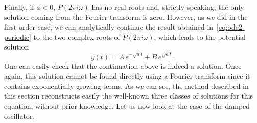 Finally, if $a<0$, $P(2\pi i\omega)$ has no real roots and, strictly speaking, the only
solution coming from the Fourier transform is zero. However, as we did in the first-order
case, we can analytically continue the result obtained in~\cref{eq:ode2-periodic} to the
two complex roots of $P(2\pi i\omega)$, which leads to the potential solution
\begin{equation}
  y(t)=A\,e^{-\sqrt{a}t}+B\,e^{\sqrt{a}t}\,.
  \label{eq:ode2-exp}
\end{equation}
One can easily check that the continuation above is indeed a solution. Once again, this
solution cannot be found directly using a Fourier transform since it contains
exponentially growing terms. As we can see, the method described in this section
reconstructs easily the well-known three classes of solutions for this equation, without
prior knowledge. Let us now look at the case of the damped oscillator.

